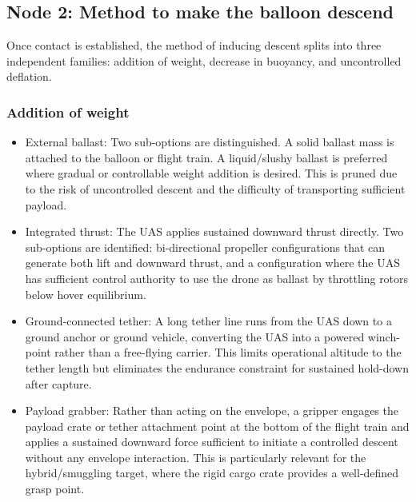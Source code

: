 \subsection{Node 2: Method to make the balloon descend}

Once contact is established, the method of inducing descent splits into three independent families: addition of weight, decrease in buoyancy, and uncontrolled deflation.
\vspace{-8pt}
\subsubsection*{Addition of weight}

\begin{itemize}[leftmargin=*]

    \item External ballast: Two sub-options are distinguished. A solid ballast mass is attached to the balloon or flight train. A liquid/slushy ballast is preferred where gradual or controllable weight addition is desired. This is pruned due to the risk of uncontrolled descent and the difficulty of transporting sufficient payload.

    \item Integrated thrust: The UAS applies sustained downward thrust directly. Two sub-options are identified: bi-directional propeller configurations that can generate both lift and downward thrust, and a configuration where the UAS has sufficient control authority to use the drone as ballast by throttling rotors below hover equilibrium.

    \item Ground-connected tether: A long tether line runs from the UAS down to a ground anchor or ground vehicle, converting the UAS into a powered winch-point rather than a free-flying carrier. This limits operational altitude to the tether length but eliminates the endurance constraint for sustained hold-down after capture.

    \item Payload grabber:
    Rather than acting on the envelope, a gripper engages the payload crate or tether attachment point at the bottom of the flight train and applies a sustained downward force sufficient to initiate a controlled descent without any envelope interaction. This is particularly relevant for the hybrid/smuggling target, where the rigid cargo crate provides a well-defined grasp point.

\end{itemize}
\vspace{-18pt}
